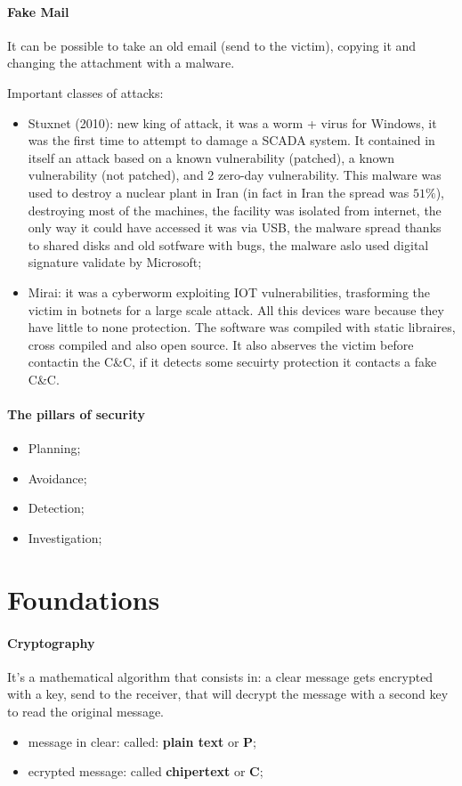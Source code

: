 \documentclass[12pt]{article}
\begin{document}
\paragraph{Fake Mail}
It can be possible to take an old email (send to the victim), copying it and changing the attachment with a malware.

Important classes of attacks:
\begin{itemize}
    \item  Stuxnet (2010): new king of attack, it was a worm + virus for Windows, it was the first time to attempt to damage a SCADA system. It contained in itself an attack based on a known vulnerability (patched), a known vulnerability (not patched), and 2 zero-day vulnerability. This malware was used to destroy a nuclear plant in Iran (in fact in Iran the spread was $51\%$), destroying most of the machines, the facility was isolated from internet, the only way it could have accessed it was via USB, the malware spread thanks to shared disks and old sotfware with bugs, the malware aslo used digital signature validate by Microsoft;
    \item Mirai: it was a cyberworm exploiting IOT vulnerabilities, trasforming the victim in botnets for a large scale attack. All this devices ware because they have little to none protection. The software was compiled with static libraires, cross compiled and also open source. It also abserves the victim before contactin the C\&C, if it detects some secuirty protection it contacts a fake C\&C.
\end{itemize}

\paragraph{The pillars of security}
\begin{itemize}
    \item Planning;
    \item Avoidance;
    \item Detection;
    \item Investigation;
\end{itemize}



\section{Foundations}
\paragraph{Cryptography}
It's a mathematical algorithm that consists in: a clear message gets encrypted with a key, send to the receiver, that will decrypt the message with a second key to read the original message.
\begin{itemize}
    \item message in clear: called: \textbf{plain text} or \textbf{P};
    \item ecrypted message: called \textbf{chipertext} or \textbf{C};
\end{itemize}
\end{document}
